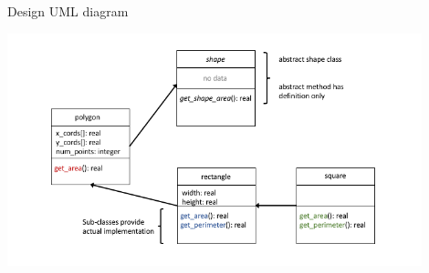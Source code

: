 \documentclass[11pt]{beamer}
\begin{document}
\begin{frame}{Design} 
UML diagram
\begin{center} 
  \includegraphics[width=0.9\textwidth]{../../shared/shapes_uml.png} 
\end{center} 

\end{frame} 

\end{document}
